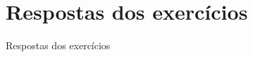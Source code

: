 \section{Respostas dos exercícios}

\begin{frame}[allowframebreaks]{Respostas dos exercícios}
    
\end{frame}